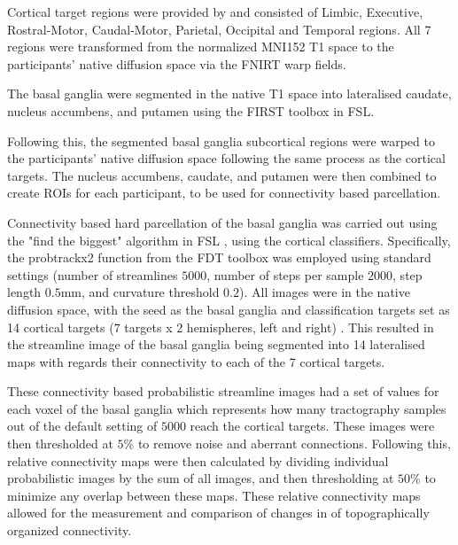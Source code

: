Cortical target regions were provided by  and consisted of Limbic, Executive, Rostral-Motor, Caudal-Motor, Parietal, Occipital and Temporal regions. All 7 regions were transformed from the normalized MNI152 T1 space to the participants’ native diffusion space via the \ac{FNIRT} warp fields.\par
The basal ganglia were segmented in the native T1 space into lateralised caudate, nucleus accumbens, and putamen using the FIRST toolbox in \ac{FSL}.\par
Following this, the segmented basal ganglia subcortical regions were warped to the participants’ native diffusion space following the same process as the cortical targets. The nucleus accumbens, caudate, and putamen were then combined to create \ac{ROI}s for each participant, to be used for connectivity based parcellation.\par
Connectivity based hard parcellation of the basal ganglia was carried out using the "find the biggest" algorithm in \ac{FSL} \cite{biggest}, using the cortical classifiers. Specifically, the probtrackx2 function from the \ac{FDT} toolbox was employed using standard settings (number of streamlines $5000$, number of steps per sample $2000$, step length $0.5$mm, and curvature threshold $0.2$). All images were in the native diffusion space, with the seed as the basal ganglia and classification targets set as 14 cortical targets ($7$ targets x $2$ hemispheres, left and right) \cite{tract}. This resulted in the streamline image of the basal ganglia being segmented into 14 lateralised maps with regards their connectivity to each of the 7 cortical targets.\par
These connectivity based probabilistic streamline images had a set of values for each voxel of the basal ganglia which represents how many tractography samples out of the default setting of $5000$ reach the cortical targets. These images were then thresholded at $5$\% to remove noise and aberrant connections. Following this, relative connectivity maps were then calculated by dividing individual probabilistic images by the sum of all images, and then thresholding at $50$\% to minimize any overlap between these maps. These relative connectivity maps allowed for the measurement and comparison of changes in of topographically organized connectivity.